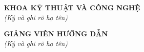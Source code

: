 \vspace{0.35cm}
\noindent
\begin{minipage}[t]{0.48\textwidth}
\centering
\textbf{KHOA KỸ THUẬT VÀ CÔNG NGHỆ} \\
\textit{(Ký và ghi rõ họ tên)}
\end{minipage}
\hfill
\begin{minipage}[t]{0.48\textwidth}
\centering
\textbf{GIẢNG VIÊN HƯỚNG DẪN} \\
\textit{(Ký và ghi rõ họ tên)} \\[1.5cm]
\textbf{\nguoihuongdan}
\end{minipage}
\endgroup
